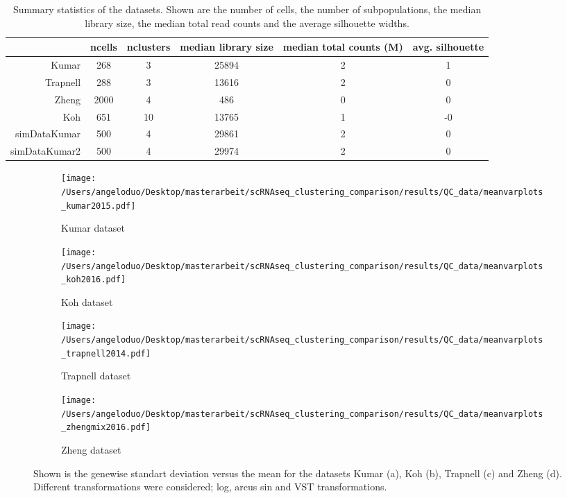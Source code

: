 \documentclass[12pt, a4paper]{article}\usepackage[]{graphicx}\usepackage[]{color}
\begin{document}
\begin{table}[ht]
\centering
\begin{tabular}{rccccc}
  \hline
 & ncells & nclusters & median library size & median total counts (M) & avg. silhouette \\ 
  \hline
Kumar & 268 & 3 & 25894 & 2 & 1 \\ 
  Trapnell & 288 & 3 & 13616 & 2 & 0 \\ 
  Zheng & 2000 & 4 & 486 & 0 & 0 \\ 
  Koh & 651 & 10 & 13765 & 1 & -0 \\ 
  simDataKumar & 500 & 4 & 29861 & 2 & 0 \\ 
  simDataKumar2 & 500 & 4 & 29974 & 2 & 0 \\ 
   \hline
\end{tabular}
\caption{Summary statistics of the datasets. Shown are the number of cells, the number of subpopulations, the median library size, the median total read counts and the average silhouette widths.} 
\label{tbl:data}
\end{table}



\begin{figure}
\centering
\begin{subfigure}{.5\textwidth}
  \centering
  \texttt{[image: /Users/angeloduo/Desktop/masterarbeit/scRNAseq\_clustering\_comparison/results/QC\_data/meanvarplots\_kumar2015.pdf]}
  \caption{Kumar dataset}
  \label{fig:transsim}
\end{subfigure}%
\begin{subfigure}{.5\textwidth}
  \centering
  \texttt{[image: /Users/angeloduo/Desktop/masterarbeit/scRNAseq\_clustering\_comparison/results/QC\_data/meanvarplots\_koh2016.pdf]}
  \caption{Koh dataset}
  \label{fig:transkoh}
\end{subfigure}
\begin{subfigure}{.5\textwidth}
  \centering
  \texttt{[image: /Users/angeloduo/Desktop/masterarbeit/scRNAseq\_clustering\_comparison/results/QC\_data/meanvarplots\_trapnell2014.pdf]}
  \caption{Trapnell dataset}
  \label{fig:transtrapnell}
\end{subfigure}%
\begin{subfigure}{.5\textwidth}
  \centering
  \texttt{[image: /Users/angeloduo/Desktop/masterarbeit/scRNAseq\_clustering\_comparison/results/QC\_data/meanvarplots\_zhengmix2016.pdf]}
  \caption{Zheng dataset}
  \label{fig:transzheng}
\end{subfigure}
\caption{Shown is the genewise standart deviation versus the mean for the datasets Kumar (a), Koh (b), Trapnell (c) and Zheng (d). Different transformations were considered; log, arcus sin and VST transformations. }
\label{fig:trans}
\end{figure}
\end{document}
